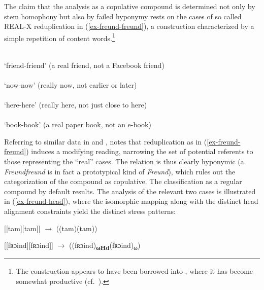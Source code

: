 \documentclass[output=paper
 ,nobabel
 ,draftmode
 ,colorlinks, citecolor=brown
]{langscibook}
\begin{document}
\zl

\noindent
The claim that the analysis as a copulative compound is determined not only by stem homophony but also by failed hyponymy rests on the  cases of so called REAL-X reduplication in (\ref{ex-freund-freund}), a construction characterized by a simple repetition of content words.\footnote{The construction appears to have been borrowed into , where it has become somewhat productive (cf.\ \citealp{Freywald2015}).}



\eal\label{ex-freund-freund}

\ex {} \\
`friend-friend' (a real friend, not a Facebook friend) \\

\ex {} \\
`now-now' (really now, not earlier or later) \\

\ex {} \\
`here-here' (really here, not just close to here) \\

\ex {} \\
`book-book' (a real paper book, not an e-book) \\


\zl

\largerpage
\noindent
Referring to similar data in  and , \citet[48]{Horn1993} notes that reduplication as in (\ref{ex-freund-freund}) induces a modifying reading, narrowing the set of potential referents to those representing the ``real'' cases. The relation is thus clearly hyponymic (\eg a \emph{Freundfreund} is in fact a prototypical kind of \emph{Freund}), which rules out the categorization of the compound as copulative. The classification as a regular compound by default results. The analysis of the relevant two cases is illustrated in (\ref{ex-freund-head}), where the isomorphic mapping along with the distinct head alignment constraints yield the distinct stress patterns:

\eal\label{ex-freund-head}

\ex\label{ex-tamtam-comp}
[[tam][tam]]\textbf{} $\rightarrow$ ((tam)(tam))\textbf{} 

\ex\label{ex-freundfreund-comp}
[[fʀɔind][fʀɔind]]\textbf{} $\rightarrow$
((fʀɔind)\textbf{\textsubscript{ωHd}}(fʀɔind)\textsubscript{ω})
\zl
\end{document}
